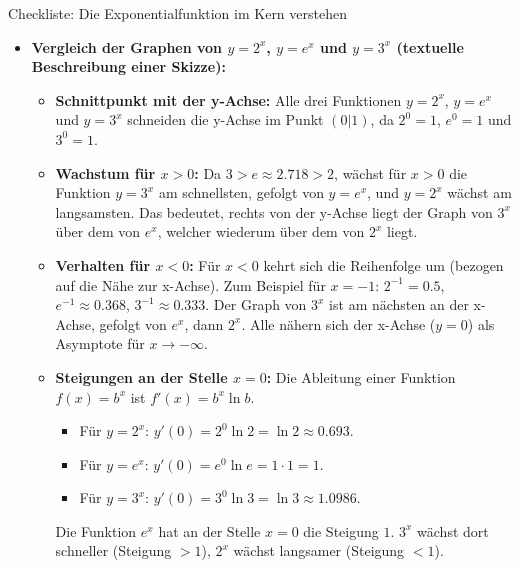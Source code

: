 \begin{loesungsumgebung}{Checkliste: Die Exponentialfunktion im Kern verstehen}
\begin{enumerate}[label=(\alph*)]
\begin{itemize}
        \item \textbf{Vergleich der Graphen von $y=2^x$, $y=e^x$ und $y=3^x$ (textuelle Beschreibung einer Skizze):}
        \begin{itemize}
            \item \textbf{Schnittpunkt mit der y-Achse:} Alle drei Funktionen $y=2^x$, $y=e^x$ und $y=3^x$ schneiden die y-Achse im Punkt $(0|1)$, da $2^0=1$, $e^0=1$ und $3^0=1$.
            \item \textbf{Wachstum für $x>0$:} Da $3 > e \approx 2.718 > 2$, wächst für $x>0$ die Funktion $y=3^x$ am schnellsten, gefolgt von $y=e^x$, und $y=2^x$ wächst am langsamsten. Das bedeutet, rechts von der y-Achse liegt der Graph von $3^x$ über dem von $e^x$, welcher wiederum über dem von $2^x$ liegt.
            \item \textbf{Verhalten für $x<0$:} Für $x<0$ kehrt sich die Reihenfolge um (bezogen auf die Nähe zur x-Achse). Zum Beispiel für $x=-1$: $2^{-1}=0.5$, $e^{-1} \approx 0.368$, $3^{-1} \approx 0.333$. Der Graph von $3^x$ ist am nächsten an der x-Achse, gefolgt von $e^x$, dann $2^x$. Alle nähern sich der x-Achse ($y=0$) als Asymptote für $x \to -\infty$.
            \item \textbf{Steigungen an der Stelle $x=0$:} Die Ableitung einer Funktion $f(x)=b^x$ ist $f'(x)=b^x \ln b$.
            \begin{itemize}
                \item Für $y=2^x$: $y'(0) = 2^0 \ln 2 = \ln 2 \approx 0.693$.
                \item Für $y=e^x$: $y'(0) = e^0 \ln e = 1 \cdot 1 = 1$.
                \item Für $y=3^x$: $y'(0) = 3^0 \ln 3 = \ln 3 \approx 1.0986$.
            \end{itemize}
            Die Funktion $e^x$ hat an der Stelle $x=0$ die Steigung $1$. $3^x$ wächst dort schneller (Steigung $>1$), $2^x$ wächst langsamer (Steigung $<1$).
        \end{itemize}
    \end{itemize}


\end{enumerate}
\end{loesungsumgebung}

